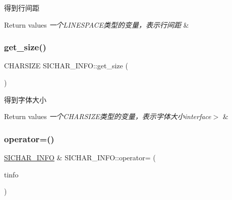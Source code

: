 得到行间距~\newline



\begin{DoxyRetVals}{Return values}
{\em 一个\+L\+I\+N\+E\+S\+P\+A\+C\+E类型的变量，表示行间距} & \\
\hline
\end{DoxyRetVals}
\mbox{\label{class_s_i_c_h_a_r___i_n_f_o_aae2cfbd0b6bbb122008da027f662291b}} 
\subsubsection{\texorpdfstring{get\+\_\+size()}{get\_size()}}
{\footnotesize\ttfamily C\+H\+A\+R\+S\+I\+ZE S\+I\+C\+H\+A\+R\+\_\+\+I\+N\+F\+O\+::get\+\_\+size (\begin{DoxyParamCaption}{ }\end{DoxyParamCaption})\hspace{0.3cm}{\ttfamily [inline]}}



得到字体大小~\newline



\begin{DoxyRetVals}{Return values}
{\em 一个\+C\+H\+A\+R\+S\+I\+Z\+E类型的变量，表示字体大小interface$>$} & \\
\hline
\end{DoxyRetVals}
\mbox{\label{class_s_i_c_h_a_r___i_n_f_o_a3083fe977f3675c45f0da8e9c38a399c}} 
\subsubsection{\texorpdfstring{operator=()}{operator=()}}
{\footnotesize\ttfamily \hyperlink{class_s_i_c_h_a_r___i_n_f_o}{S\+I\+C\+H\+A\+R\+\_\+\+I\+N\+FO} \& S\+I\+C\+H\+A\+R\+\_\+\+I\+N\+F\+O\+::operator= (\begin{DoxyParamCaption}\item[{const \hyperlink{class_s_i_c_h_a_r___i_n_f_o}{S\+I\+C\+H\+A\+R\+\_\+\+I\+N\+FO} \&}]{tinfo }\end{DoxyParamCaption})}



